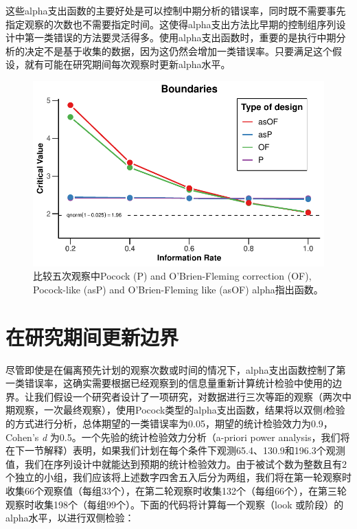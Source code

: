 \documentclass[
  letterpaper,
  DIV=11,
  numbers=noendperiod]{scrreprt}
\begin{document}
这些alpha支出函数的主要好处是可以控制中期分析的错误率，同时既不需要事先指定观察的次数也不需要指定时间。这使得alpha支出方法比早期的控制组序列设计中第一类错误的方法要灵活得多。使用alpha支出函数时，重要的是执行中期分析的决定不是基于收集的数据，因为这仍然会增加一类错误率。只要满足这个假设，就有可能在研究期间每次观察时更新alpha水平。

\begin{figure}

{\centering \includegraphics[width=1\textwidth,height=\textheight]{10-sequential_files/figure-pdf/fig-comparison-1.pdf}

}

\caption{\label{fig-comparison}比较五次观察中Pocock (P) and
O'Brien-Fleming correction (OF), Pocock-like (asP) and O'Brien-Fleming
like (asOF) alpha指出函数。}

\end{figure}

\hypertarget{ux5728ux7814ux7a76ux671fux95f4ux66f4ux65b0ux8fb9ux754c}{%
\section{在研究期间更新边界}\label{ux5728ux7814ux7a76ux671fux95f4ux66f4ux65b0ux8fb9ux754c}}

尽管即使是在偏离预先计划的观察次数或时间的情况下，alpha支出函数控制了第一类错误率，这确实需要根据已经观察到的信息量重新计算统计检验中使用的边界。让我们假设一个研究者设计了一项研究，对数据进行三次等距的观察（两次中期观察，一次最终观察），使用Pocock类型的alpha支出函数，结果将以双侧\emph{t}检验的方式进行分析，总体期望的一类错误率为0.05，期望的统计检验效力为0.9，Cohen's
\emph{d} 为0.5。一个先验的统计检验效力分析（a-priori power
analysis，我们将在下一节解释）表明，如果我们计划在每个条件下观测65.4、130.9和196.3个观测值，我们在序列设计中就能达到预期的统计检验效力。由于被试个数为整数且有2个独立的小组，我们应该将上述数字四舍五入后分为两组，我们将在第一轮观察时收集66个观察值（每组33个），在第二轮观察时收集132个（每组66个），在第三轮观察时收集198个（每组99个）。下面的代码将计算每一个观察（look
或阶段）的alpha水平，以进行双侧检验：
\end{document}
